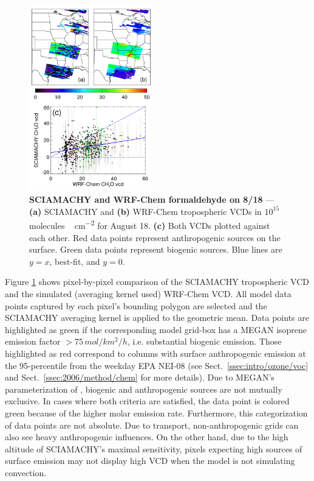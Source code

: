 	\begin{figure}
		\centering
		\vspace{-.3in}
		\begin{singlespacing}
		\includegraphics[width=0.48\textwidth]{scia_ch2o_compare_0818}
		\caption[SCIAMACHY and WRF-Chem formaldehyde on 8/18]{{\small\textbf{SCIAMACHY and WRF-Chem formaldehyde on 8/18} --- \textbf{(a)} SCIAMACHY and
		\textbf{(b)} WRF-Chem  tropospheric VCDs in $10^{15}\,$\unit{molecules\,cm^{-2}} for August 18. \textbf{(c)} Both VCDs plotted against each other.
		Red data points represent anthropogenic sources on the surface. Green data points represent biogenic sources. Blue lines are $y=x$, best-fit, and $y=0$.}}
		\label{fig:2006/scia_hcho_0818}
		\end{singlespacing}
		\vspace{-.2in}
	\end{figure}

Figure \ref{fig:2006/scia_hcho_0818} shows pixel-by-pixel comparison of the SCIAMACHY  tropospheric VCD and the simulated (averaging kernel used) WRF-Chem
 VCD. All model data points captured by each pixel's bounding polygon are selected and the SCIAMACHY averaging kernel is applied to the geometric mean. Data
points are highlighted as green if the corresponding model grid-box has a MEGAN isoprene emission factor $>75\,\unit{mol/km^2/h}$, i.e. substantial biogenic emission. Those
highlighted as red correspond to columns with surface anthropogenic  emission at the 95-percentile from the weekday EPA NEI-08 (see
Sect.~\ref{ssec:intro/ozone/voc} and Sect.~\ref{ssec:2006/method/chem} for more details). Due to MEGAN's parameterization of , biogenic and anthropogenic sources are not
mutually exclusive. In cases where both criteria are satisfied, the data point is colored green because of the higher molar emission rate. Furthermore, this categorization of data points
are not absolute. Due to transport, non-anthropogenic grids can also see heavy anthropogenic influences. On the other hand, due to the high altitude of SCIAMACHY's maximal
sensitivity, pixels expecting high sources of surface emission may not display high VCD when the model is not simulating convection.


